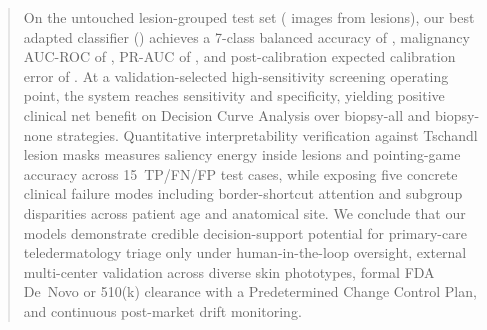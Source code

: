 \begin{abstract}
On the untouched lesion-grouped test set (\WSixTestImgs{} images from \WSixTestLesions{} lesions), our best adapted classifier (\WSixBestModel{}) achieves a 7-class balanced accuracy of \WSixBestBalAcc{}, malignancy AUC-ROC of \WSixBestMalAUC{}, PR-AUC of \WSixBestMalPRAUC{}, and post-calibration expected calibration error of \WSixBestECE{}. At a validation-selected high-sensitivity screening operating point, the system reaches \WSixBestSensScr{} sensitivity and \WSixBestSpecScr{} specificity, yielding positive clinical net benefit on Decision Curve Analysis over biopsy-all and biopsy-none strategies. Quantitative interpretability verification against Tschandl lesion masks measures \WSixXaiLesionEnergy{} saliency energy inside lesions and \WSixXaiPointingAcc{} pointing-game accuracy across 15~TP/FN/FP test cases, while exposing five concrete clinical failure modes including border-shortcut attention and subgroup disparities across patient age and anatomical site. We conclude that our models demonstrate credible decision-support potential for primary-care teledermatology triage only under human-in-the-loop oversight, external multi-center validation across diverse skin phototypes, formal FDA De~Novo or 510(k) clearance with a Predetermined Change Control Plan, and continuous post-market drift monitoring.
\end{abstract}
